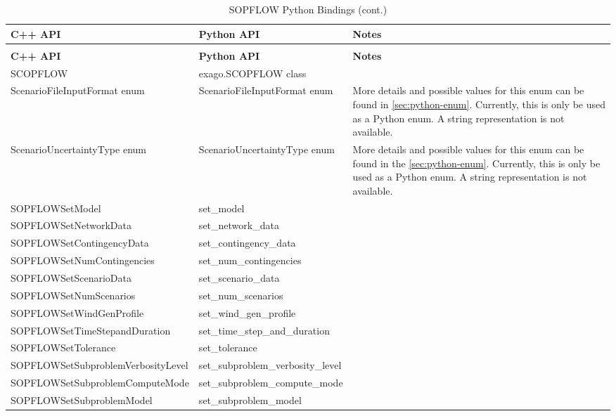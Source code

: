 { \footnotesize
  \begin{longtable}{|>{\ttfamily}p{}|>{\ttfamily}p{}|p{}|}
    \caption{SOPFLOW Python Bindings}
    \label{table:sopflow-python-bindings } \\
    \hline
    \textbf{\textrm{C++ API}} & \textbf{\textrm{Python API}} & \textbf{Notes}\\ [0.5ex]  
    \hline
    \endfirsthead
    \caption{SOPFLOW Python Bindings (cont.)} \\
    \hline
    \textbf{\textrm{C++ API}} & \textbf{\textrm{Python API}} & \textbf{Notes}\\ [0.5ex]  
    \hline
    \endhead
    SCOPFLOW & exago.SCOPFLOW class &  \\ \hline
    ScenarioFileInputFormat enum & ScenarioFileInputFormat enum  & More details and possible values for this enum can be found in \ref{sec:python-enum}. Currently, this is only be used as a Python enum. A string representation is not available. \\ \hline
    ScenarioUncertaintyType enum & ScenarioUncertaintyType enum  &
    More details and possible values for this enum can be found in the
    \ref{sec:python-enum}. Currently, this is only be used as a Python enum. A string representation is not available. \\ \hline
    SOPFLOWSetModel & set\_model &  \\ \hline
    SOPFLOWSetNetworkData & set\_network\_data &  \\ \hline
    SOPFLOWSetContingencyData & set\_contingency\_data &  \\ \hline
    SOPFLOWSetNumContingencies & set\_num\_contingencies &  \\ \hline
    SOPFLOWSetScenarioData & set\_scenario\_data &  \\ \hline
    SOPFLOWSetNumScenarios & set\_num\_scenarios &  \\ \hline
    SOPFLOWSetWindGenProfile & set\_wind\_gen\_profile &  \\ \hline
    SOPFLOWSetTimeStepandDuration & set\_time\_step\_and\_duration &  \\ \hline
    SOPFLOWSetTolerance & set\_tolerance &  \\ \hline
    SOPFLOWSetSubproblemVerbosityLevel & set\_subproblem\_verbosity\_level &  \\ \hline
    SOPFLOWSetSubproblemComputeMode & set\_subproblem\_compute\_mode &  \\ \hline
    SOPFLOWSetSubproblemModel & set\_subproblem\_model &  \\ \hline

\end{longtable}}
